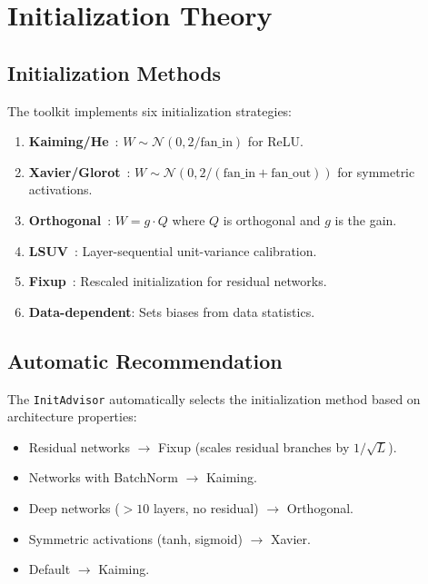 \documentclass[10pt]{article}
\theoremstyle{definition}
\begin{document}
\section{Initialization Theory}
\label{sec:init}

\subsection{Initialization Methods}

The toolkit implements six initialization strategies:

\begin{enumerate}[nosep]
  \item \textbf{Kaiming/He}~\citep{he2015delving}: $W \sim \mathcal{N}(0, 2/\text{fan\_in})$ for ReLU.
  \item \textbf{Xavier/Glorot}~\citep{glorot2010understanding}: $W \sim \mathcal{N}(0, 2/(\text{fan\_in}+\text{fan\_out}))$ for symmetric activations.
  \item \textbf{Orthogonal}~\citep{saxe2014exact}: $W = g \cdot Q$ where $Q$ is orthogonal and $g$ is the gain.
  \item \textbf{LSUV}~\citep{mishkin2016all}: Layer-sequential unit-variance calibration.
  \item \textbf{Fixup}~\citep{zhang2019fixup}: Rescaled initialization for residual networks.
  \item \textbf{Data-dependent}: Sets biases from data statistics.
\end{enumerate}

\subsection{Automatic Recommendation}

The \texttt{InitAdvisor} automatically selects the initialization method based on architecture properties:
\begin{itemize}[nosep]
  \item Residual networks $\to$ Fixup (scales residual branches by $1/\sqrt{L}$).
  \item Networks with BatchNorm $\to$ Kaiming.
  \item Deep networks ($>10$ layers, no residual) $\to$ Orthogonal.
  \item Symmetric activations (tanh, sigmoid) $\to$ Xavier.
  \item Default $\to$ Kaiming.
\end{itemize}
\end{document}
